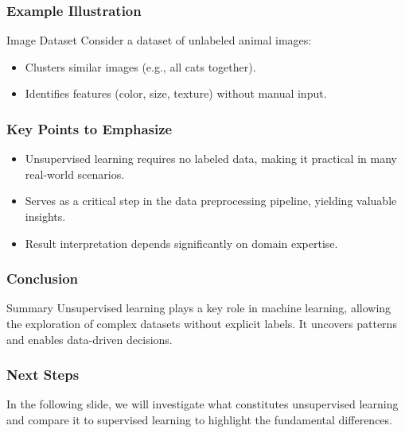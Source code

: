 \documentclass[aspectratio=169]{beamer}
\begin{document}
\begin{frame}[fragile]
    \frametitle{Example Illustration}
    \begin{block}{Image Dataset}
        Consider a dataset of unlabeled animal images:
        \begin{itemize}
            \item Clusters similar images (e.g., all cats together).
            \item Identifies features (color, size, texture) without manual input.
        \end{itemize}
    \end{block}
\end{frame}

\begin{frame}[fragile]
    \frametitle{Key Points to Emphasize}
    \begin{itemize}
        \item Unsupervised learning requires no labeled data, making it practical in many real-world scenarios.
        \item Serves as a critical step in the data preprocessing pipeline, yielding valuable insights.
        \item Result interpretation depends significantly on domain expertise.
    \end{itemize}
\end{frame}

\begin{frame}[fragile]
    \frametitle{Conclusion}
    \begin{block}{Summary}
        Unsupervised learning plays a key role in machine learning, allowing the exploration of complex datasets without explicit labels. It uncovers patterns and enables data-driven decisions.
    \end{block}
\end{frame}

\begin{frame}[fragile]
    \frametitle{Next Steps}
    In the following slide, we will investigate what constitutes unsupervised learning and compare it to supervised learning to highlight the fundamental differences.
\end{frame}
\end{document}
